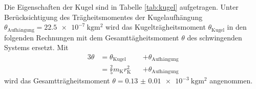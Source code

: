 \begin{figure}[H]
\centering
\begin{minipage}[t]{0.4\textwidth}
\centering


\end{minipage}
\hspace{5pt}
\begin{minipage}[t]{0.4\textwidth}
\centering


\end{minipage}
\end{figure}

Die Eigenschaften der Kugel sind in Tabelle \ref{tab:kugel} aufgetragen.
Unter Berücksichtigung des Trägheitsmomentes der Kugelaufhängung $\theta_\text{Aufhängung}=\SI{22.5e-7}{\kilo\gram\meter\squared}$ \cite{V102} wird das Kugelträgheitsmoment $\theta_\text{Kugel}$ in den folgenden Rechnungen mit dem Gesamttägheitsmoment $\theta$ des schwingenden Systems ersetzt.
Mit 
\begin{alignat}{3}
	\theta	&=\theta_\text{Kugel} &&+\theta_\text{Aufhängung}\label{eq:gesamttraegheit}\\ 
		&=\frac{2}{5} m_\text{K} r_\text{K}^2 &&+\theta_\text{Aufhängung} %
\end{alignat}
wird das Gesamtträgheitsmoment $\theta=\SI{0.13(1)e-3}{\kilo\gram\meter\squared}$ angenommen.
